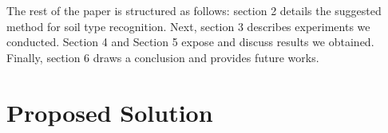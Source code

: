 \documentclass[10pt,conference]{IEEEtran}
\begin{document}


The rest of the paper is structured as follows: section 2 details the suggested method for soil type recognition. Next, section 3 describes experiments we conducted. Section 4 and Section 5 expose and discuss results we obtained. Finally, section 6 draws a conclusion and provides future works.


\section{Proposed Solution}
\end{document}

